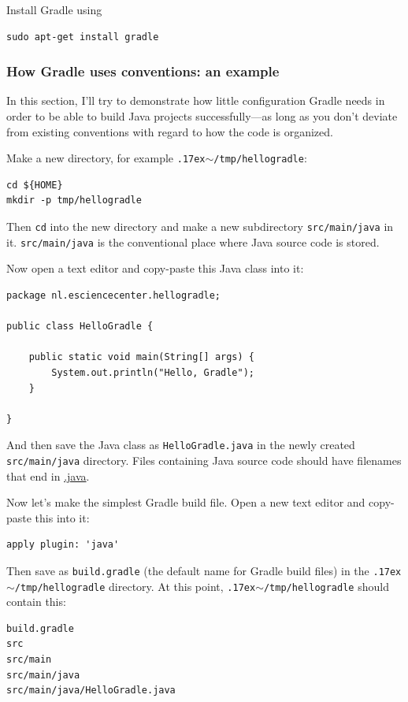 \documentclass[12pt, a4paper, twoside,openany,titlepage]{article}
\newcommand{\mytilde}{\raise.17ex\hbox{$\scriptstyle\sim$}}
\begin{document}
Install Gradle using
\begin{lstlisting}[style=basic,style=bash]
sudo apt-get install gradle
\end{lstlisting}




\subsubsection{How Gradle uses conventions: an example}

In this section, I'll try to demonstrate how little configuration Gradle needs in order to be able to build Java projects successfully---as long as you don't deviate from existing conventions with regard to how the code is organized.

Make a new directory, for example \texttt{\mytilde{}/tmp/hellogradle}:
\begin{lstlisting}[style=basic,style=bash]
cd ${HOME}
mkdir -p tmp/hellogradle
\end{lstlisting} %


Then \texttt{cd} into the new directory and make a new subdirectory \texttt{src/main/java} in it. \texttt{src/main/java} is the conventional place where Java source code is stored.

Now open a text editor and copy-paste this Java class into it:
\begin{lstlisting}[style=basic,style=Java]
package nl.esciencecenter.hellogradle;

public class HelloGradle {

    public static void main(String[] args) {
        System.out.println("Hello, Gradle");
    }

}
\end{lstlisting}
And then save the Java class as \texttt{HelloGradle.java} in the newly created \texttt{src/main/java} directory. Files containing Java source code should have filenames that end in \url{.java}.

Now let's make the simplest Gradle build file. Open a new text editor and copy-paste this into it:
\begin{lstlisting}[style=basic,style=bash]
apply plugin: 'java'
\end{lstlisting}
Then save as \texttt{build.gradle} (the default name for Gradle build files) in the \texttt{\mytilde{}/tmp/hellogradle} directory. At this point, \texttt{\mytilde{}/tmp/hellogradle} should contain this:
\begin{lstlisting}[style=basic,style=bash]
build.gradle
src
src/main
src/main/java
src/main/java/HelloGradle.java
\end{lstlisting}
\end{document}
